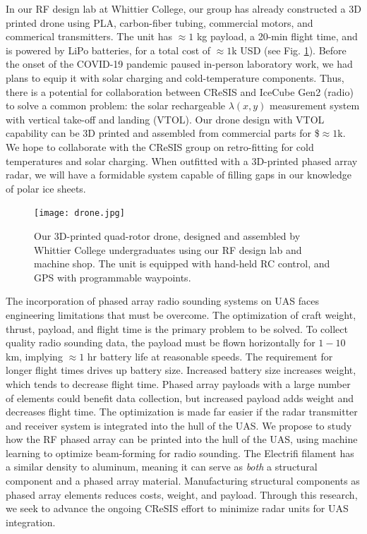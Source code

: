 \documentclass[../../main.tex]{subfiles}
\begin{document}
In our RF design lab at Whittier College, our group has already constructed a 3D printed drone using PLA, carbon-fiber tubing, commercial motors, and commerical transmitters.  The unit has $\approx 1$ kg payload, a 20-min flight time, and is powered by LiPo batteries, for a total cost of $\approx 1$k USD (see Fig. \ref{fig:drone}).  Before the onset of the COVID-19 pandemic paused in-person laboratory work, we had plans to equip it with solar charging and cold-temperature components.  Thus, there is a potential for collaboration between CReSIS and IceCube Gen2 (radio) to solve a common problem: the solar rechargeable $\lambda(x,y)$ measurement system with vertical take-off and landing (VTOL).  Our drone design with VTOL capability can be 3D printed and assembled from commercial parts for \$$\approx1$k.  We hope to collaborate with the CReSIS group on retro-fitting for cold temperatures and solar charging.  When outfitted with a 3D-printed phased array radar, we will have a formidable system capable of filling gaps in our knowledge of polar ice sheets.  \\ \vspace{2.5mm}

\begin{figure}
\centering
\texttt{[image: drone.jpg]}
\caption{\label{fig:drone} Our 3D-printed quad-rotor drone, designed and assembled by Whittier College undergraduates using our RF design lab and machine shop.  The unit is equipped with hand-held RC control, and GPS with programmable waypoints.}
\end{figure}

The incorporation of phased array radio sounding systems on UAS faces engineering limitations that must be overcome.  The optimization of craft weight, thrust, payload, and flight time is the primary problem to be solved.  To collect quality radio sounding data, the payload must be flown horizontally for $1-10$ km, implying $\approx 1$ hr battery life at reasonable speeds.  The requirement for longer flight times drives up battery size.  Increased battery size increases weight, which tends to decrease flight time.  Phased array payloads with a large number of elements could benefit data collection, but increased payload adds weight and decreases flight time.  The optimization is made far easier if the radar transmitter and receiver system is integrated into the hull of the UAS.  We propose to study how the RF phased array can be printed into the hull of the UAS, using machine learning to optimize beam-forming for radio sounding.  The Electrifi filament has a similar density to aluminum, meaning it can serve as \textit{both} a structural component and a phased array material.  Manufacturing structural components as phased array elements reduces costs, weight, and payload.  Through this research, we seek to advance the ongoing CReSIS effort to minimize radar units for UAS integration.  \\ \vspace{2.5mm}
\end{document}
